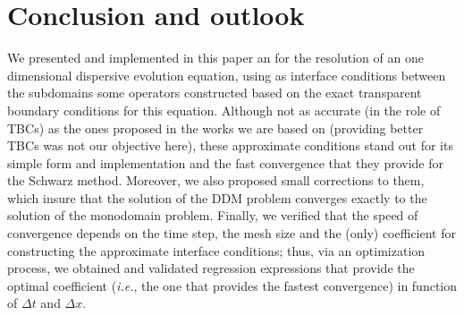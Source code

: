 \section{Conclusion and outlook}

\indent We presented and implemented in this paper an  for the resolution of an one dimensional dispersive evolution equation, using as interface conditions between the subdomains some operators constructed based on the exact transparent boundary conditions for this equation. Although not as accurate (in the role of TBCs) as the ones proposed in the works we are based on (providing better TBCs was not our objective here), these approximate conditions stand out for its simple form and implementation and the fast convergence that they provide for the Schwarz method. Moreover, we also proposed small corrections to them, which insure that the solution of the DDM problem converges exactly to the solution of the monodomain problem. Finally, we verified that the speed of convergence depends on the time step, the mesh size and the (only) coefficient for constructing the approximate interface conditions; thus, via an optimization process, we obtained and validated regression expressions that provide the optimal coefficient (\emph{i.e.}, the one that provides the fastest convergence) in function of $\Delta t $ and $\Delta x$.

\indent {}